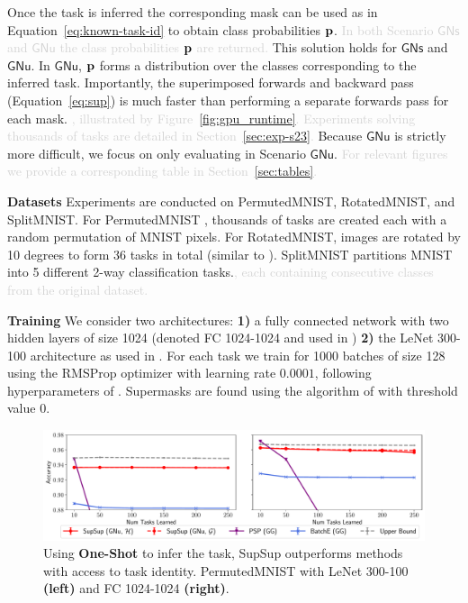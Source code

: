 \documentclass{article}
\newcommand{\ac}{SupSup\xspace}
\newcommand{\comments}[1]{#1}
\newcommand{\comments}[1]{}
\newcommand{\removed}[1]{\comments{\textcolor{lightgray}{#1}}}
\newcommand{\casename}[1]{\ensuremath{\mathsf{#1}}\xspace}
\newcommand{\secref}[1]{Section~\ref{sec:#1}}
\begin{document}
Once the task is inferred the corresponding mask can be used as in Equation~\ref{eq:known-task-id} to obtain class probabilities $\mathbf{p}$. \removed{In both Scenario \casename{GNs} and \casename{GNu} the class probabilities $\mathbf{p}$ are returned.} This solution holds for \casename{GNs} and \casename{GNu}. In \casename{GNu}, $\mathbf{p}$ forms a distribution over the classes corresponding to the inferred task. Importantly, the superimposed forwards and backward pass (Equation~\ref{eq:sup}) is much faster than performing a separate forwards pass for each mask. \removed{, illustrated by Figure~\ref{fig:gpu_runtime}. Experiments solving thousands of tasks are detailed in \secref{exp-s23}.}
%
Because \casename{GNu} is strictly more difficult, we focus on only evaluating in Scenario \casename{GNu}. \removed{For relevant figures we provide a corresponding table in Section~\ref{sec:tables}.}


\textbf{Datasets } Experiments are conducted on PermutedMNIST, RotatedMNIST, and SplitMNIST. For PermutedMNIST \cite{kirkpatrick2017overcoming}, thousands of tasks are created each with a random permutation of MNIST pixels. For RotatedMNIST, images are rotated by 10 degrees to form 36 tasks in total (similar to \cite{cheung2019superposition}). SplitMNIST partitions MNIST into 5 different 2-way classification tasks.\removed{, each containing consecutive classes from the original dataset.}

\textbf{Training } We consider two architectures: \textbf{1)} a fully connected network with two hidden layers of size 1024 (denoted FC 1024-1024 and used in \citet{cheung2019superposition}) \textbf{2)} the LeNet 300-100 architecture \cite{lecun1989backpropagation} as used in \cite{frankle2018lottery, dettmers2019sparse}. 
For each task we train for 1000 batches of size 128 using the RMSProp optimizer \cite{tieleman2012lecture} with learning rate $0.0001$, following hyperparameters of \citet{cheung2019superposition}. Supermasks are found using the algorithm of \citet{mallya2018packnet} with threshold value 0.
\begin{figure}[t]
    \centering
            \vspace{-1em}
    \includegraphics[width=\columnwidth]{v1-v2.pdf}
    \caption{Using \textbf{One-Shot} to infer the task, \ac outperforms methods with access to task identity. PermutedMNIST with LeNet 300-100 \textbf{(left)} and FC 1024-1024 \textbf{(right)}.}
    \vspace{-3em}
    \label{fig:v1-v2}
\end{figure}
\end{document}
